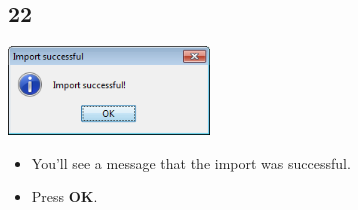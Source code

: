 \documentclass{beamer}
\begin{document}
\subsection{22}
\begin{frame}
	\begin{center}
  		\includegraphics[width=0.4\textwidth]{22.png}
	\end{center}
	\begin{itemize}
		\item You'll see a message that the import was successful.
		\item Press \textbf{OK}.
	\end{itemize}
\end{frame}
\end{document}
